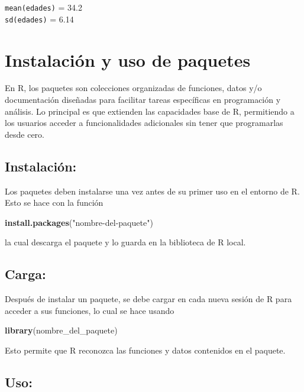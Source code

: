\documentclass[
]{book}
\newenvironment{Shaded}{\begin{snugshade}}{\end{snugshade}}
\newcommand{\FunctionTok}[1]{\textcolor[rgb]{0.13,0.29,0.53}{\textbf{#1}}}
\newcommand{\NormalTok}[1]{#1}
\newcommand{\StringTok}[1]{\textcolor[rgb]{0.31,0.60,0.02}{#1}}
\begin{document}
\texttt{mean(edades)} = 34.2\\
\texttt{sd(edades)} = 6.14

\hypertarget{paquetes}{%
\chapter{Instalación y uso de paquetes}\label{paquetes}}

En R, los paquetes son colecciones organizadas de funciones, datos y/o documentación diseñadas para facilitar tareas específicas en programación y análisis. Lo principal es que extienden las capacidades base de R, permitiendo a los usuarios acceder a funcionalidades adicionales sin tener que programarlas desde cero.

\hypertarget{instalaciuxf3n}{%
\section{Instalación:}\label{instalaciuxf3n}}

Los paquetes deben instalarse una vez antes de su primer uso en el entorno de R. Esto se hace con la función

\begin{Shaded}
\begin{Highlighting}[]
\FunctionTok{install.packages}\NormalTok{(}\StringTok{"nombre{-}del{-}paquete"}\NormalTok{)}
\end{Highlighting}
\end{Shaded}

la cual descarga el paquete y lo guarda en la biblioteca de R local.

\hypertarget{carga}{%
\section{Carga:}\label{carga}}

Después de instalar un paquete, se debe cargar en cada nueva sesión de R para acceder a sus funciones, lo cual se hace usando

\begin{Shaded}
\begin{Highlighting}[]
\FunctionTok{library}\NormalTok{(nombre\_del\_paquete)}
\end{Highlighting}
\end{Shaded}

Esto permite que R reconozca las funciones y datos contenidos en el paquete.

\hypertarget{uso}{%
\section{Uso:}\label{uso}}
\end{document}

